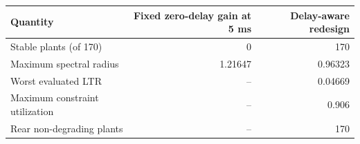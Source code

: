 \begin{tabular}{lrr}\toprule
Quantity & Fixed zero-delay gain at 5 ms & Delay-aware redesign\\\midrule
Stable plants (of 170) & 0 & 170\\
Maximum spectral radius & 1.21647 & 0.96323\\
Worst evaluated LTR & -- & 0.04669\\
Maximum constraint utilization & -- & 0.906\\
Rear non-degrading plants & -- & 170\\
\bottomrule\end{tabular}